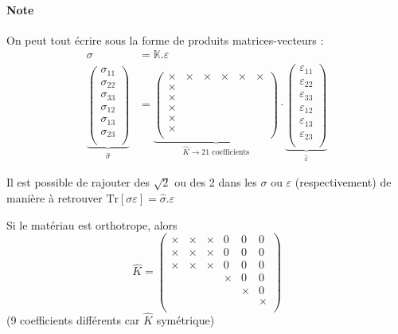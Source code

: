\documentclass{article}
\begin{document}
\paragraph{Note} On peut tout écrire sous la forme de produits matrices-vecteurs :
\begin{align*}
\sigma & = \mathbb{K}.\varepsilon\\
\underbrace{
\begin{pmatrix}
\sigma_{11}\\
\sigma_{22}\\
\sigma_{33}\\
\sigma_{12}\\
\sigma_{13}\\
\sigma_{23}\\
\end{pmatrix}}_{\hat{\sigma}}
& =
\underbrace{
\begin{pmatrix}
\times & \times & \times & \times & \times & \times\\
\times \\
\times \\
\times \\
\times \\
\times \\
\end{pmatrix}
}_{\hat{K} \to \text{21 coefficients}}
\cdot
\underbrace{
\begin{pmatrix}
\varepsilon_{11}\\
\varepsilon_{22}\\
\varepsilon_{33}\\
\varepsilon_{12}\\
\varepsilon_{13}\\
\varepsilon_{23}\\
\end{pmatrix}
}_{\hat{\varepsilon}}
\end{align*}

Il est possible de rajouter des $\sqrt{2}$ ou des 2 dans les $\sigma$ ou $\varepsilon$ (respectivement) de manière à retrouver $\text{Tr}[\sigma\varepsilon] = \hat{\sigma}.\hat{\varepsilon}$
\bigskip

Si le matériau est orthotrope, alors 
\[\hat{K} = 
\begin{pmatrix}
\times & \times & \times & 0 & 0 & 0 \\
\times & \times & \times & 0 & 0 & 0 \\
\times & \times & \times & 0 & 0 & 0 \\
&&&\times & 0 & 0\\
&&&&\times & 0 \\
&&&&&\times \\
\end{pmatrix}
\]
(9 coefficients différents car $\hat{K}$ symétrique)
\bigskip
\end{document}
